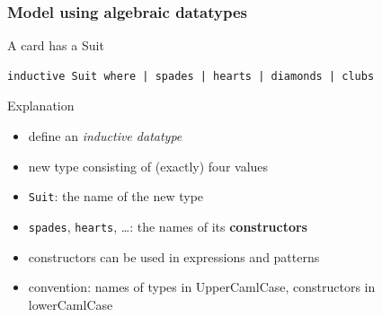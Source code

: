 \documentclass{beamer}
\begin{document}
\begin{frame}[fragile]
  \frametitle{Model using algebraic datatypes}
  \begin{block}{A card has a Suit}
\begin{lstlisting}
inductive Suit where | spades | hearts | diamonds | clubs
\end{lstlisting}
  \end{block}
  \begin{alertblock}{Explanation}
    \begin{itemize}
    \item define an \emph{inductive datatype}
    \item new type consisting of (exactly) four values
    \item \lstinline{Suit}: the name of the new type
    \item \lstinline{spades}, \lstinline{hearts}, \dots: the names of its
      \textbf{constructors}
    \item constructors can be used in expressions and patterns
    \item convention: names of types in UpperCamlCase,  constructors in
      lowerCamlCase 
    \end{itemize}
  \end{alertblock}
\end{frame}


\end{document}
